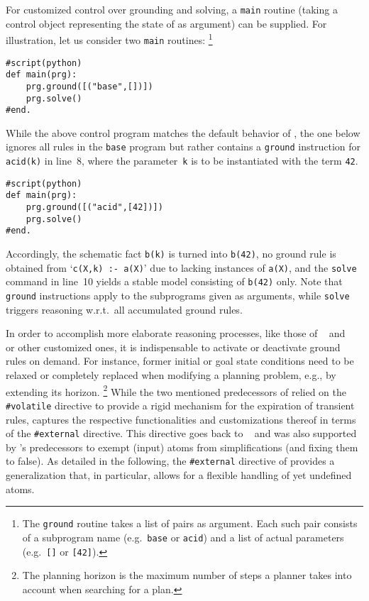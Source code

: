 For customized control over grounding and solving,
a \lstinline{main} routine
(taking a control object representing the state of \clingo{} as argument)
can be supplied.
For illustration, let us consider two \python{} \lstinline{main} routines:
\footnote{The \lstinline{ground} routine takes a list of pairs as argument.
  Each such pair consists of a subprogram name (e.g.\ \lstinline{base} or \lstinline{acid}) and a list of actual parameters (e.g.\ \lstinline{[]} or \lstinline{[42]}).}
%
\begin{lstlisting}[firstnumber=7,language=clingo]
#script(python)
def main(prg):
    prg.ground([("base",[])])
    prg.solve()
#end.
\end{lstlisting}
%
While the above control program matches the default behavior of \clingo,
the one below ignores all rules in the \lstinline{base} program but rather
contains a \lstinline{ground} instruction for \lstinline{acid(k)} in line~8,
where the parameter~\lstinline{k} is to be instantiated with the term \lstinline{42}.
%
\begin{lstlisting}[firstnumber=7,language=clingo]
#script(python)
def main(prg):
    prg.ground([("acid",[42])])
    prg.solve()
#end.
\end{lstlisting}
%
Accordingly, the schematic fact \lstinline{b(k)} is turned into \lstinline{b(42)},
no ground rule is obtained from `\lstinline{c(X,k) :- a(X)}' due to lacking instances of \lstinline{a(X)},
and the \lstinline{solve} command in line~10 yields a stable model consisting of
\lstinline{b(42)} only.
Note that \lstinline{ground} instructions apply to the subprograms
given as arguments,
while \lstinline{solve} triggers reasoning w.r.t.\ all accumulated ground rules.

In order to accomplish more elaborate reasoning processes,
like those of \iclingo~\cite{gekakaosscth08a} and \oclingo~\cite{gegrkasc11a} or other customized ones,
it is indispensable to activate or deactivate ground rules on demand.
For instance, former initial or goal state conditions need to be
relaxed or completely replaced when modifying a planning problem, e.g.,
by extending its horizon.%
\footnote{The planning horizon is the maximum number of steps a planner takes into account when searching for a plan.}
%
While the two mentioned predecessors of \clingo{} relied on the \lstinline{#volatile} directive
to provide a rigid mechanism for the expiration of transient rules,
\clingo{} captures the respective functionalities and customizations
thereof in terms of the \lstinline{#external} directive.
This directive goes back to \lparse\ \cite{lparseManual} and was also
supported by \clingo's predecessors to exempt (input) atoms
from simplifications (and fixing them to false).
As detailed in the following,
the \lstinline{#external} directive of \clingo{} provides a generalization
that, in particular, allows for a flexible handling of yet undefined atoms.

